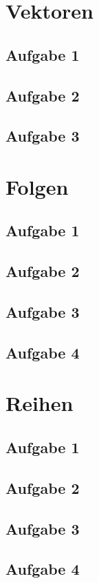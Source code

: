 \section{Vektoren}
\subsection{Aufgabe 1}

\subsection{Aufgabe 2}

\subsection{Aufgabe 3}

\section{Folgen}

\subsection{Aufgabe 1}

\subsection{Aufgabe 2}

\subsection{Aufgabe 3}

\subsection{Aufgabe 4}

\section{Reihen}

\subsection{Aufgabe 1}

\subsection{Aufgabe 2}

\subsection{Aufgabe 3}

\subsection{Aufgabe 4}
